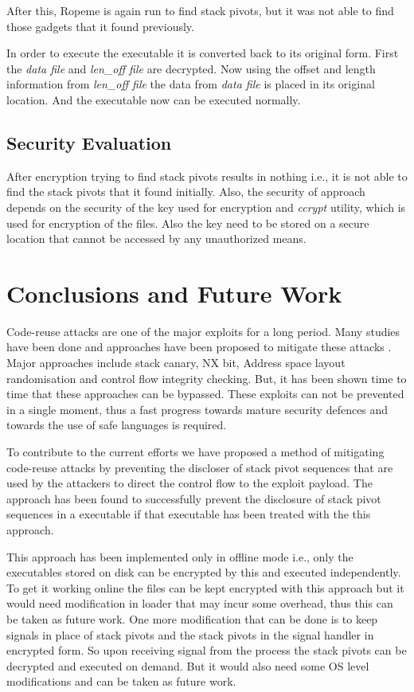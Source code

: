 \documentclass{article}
\begin{document}
\begin{multicols}{2}
	After this, Ropeme\cite{ropeme} is again run to find stack pivots, but it was not able to find those gadgets that it found previously.
	
	In order to execute the executable it is converted back to its original form. First the \textit{data file} and \textit{len\_off file} are decrypted. Now using the offset and length information from \textit{len\_off file} the data from \textit{data file} is placed in its original location. And the executable now can be executed normally.
	
	\subsection{Security Evaluation}
	After encryption trying to find stack pivots results in nothing i.e., it is not able to find the stack pivots that it found initially. Also, the security of approach depends on the security of the key used for encryption and \textit{ccrypt} utility, which is used for encryption of the files. Also the key need to be stored on a secure location that cannot be accessed by any unauthorized means.

	\section{Conclusions and Future Work}
	Code-reuse attacks are one of the major exploits for a long period. Many studies have been done and approaches have been proposed to mitigate these attacks \cite{breakdef}\cite{secrvw}\cite{memerr}\cite{marlin}. Major approaches include stack canary, NX bit, Address space layout randomisation and control flow integrity checking. But, it has been shown time to time that these approaches can be bypassed. These exploits can not be prevented in a single moment, thus a fast progress towards mature security defences and towards the use of safe languages is required.
	
	To contribute to the current efforts we have proposed a method of mitigating code-reuse attacks by preventing the discloser of stack pivot sequences that are used by the attackers to direct the control flow to the exploit payload. The approach has been found to successfully prevent the disclosure of stack pivot sequences in a executable if that executable has been treated with the this approach.
	
	This approach has been implemented only in offline mode i.e., only the executables stored on disk can be encrypted by this and executed independently. To get it working online the files can be kept encrypted with this approach but it would need modification in loader that may incur some overhead, thus this can be taken as future work. One more modification that can be done is to keep signals in place of stack pivots and the stack pivots in the signal handler in encrypted form. So upon receiving signal from the process the stack pivots can be decrypted and executed on demand. But it would also need some OS level modifications and can be taken as future work.
	
    
    
	
	\end{multicols}
\end{document}
